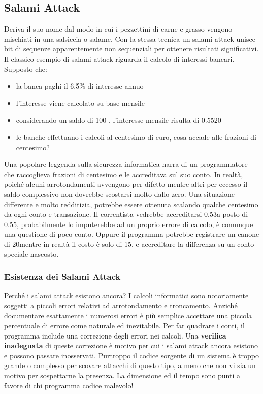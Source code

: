 \subsection{Salami Attack}
Deriva il suo nome dal modo in cui i pezzettini di carne e grasso vengono mischiati in una salsiccia o salame. Con la stessa tecnica un salami attack unisce bit di sequenze apparentemente non sequenziali per ottenere risultati significativi.
Il classico esempio di salami attack riguarda il calcolo di interessi bancari. Supposto che:
\begin{itemize}
	\item la banca paghi il 6.5\% di interesse annuo
	\item l'interesse viene calcolato su base mensile
	\item considerando un saldo di 100 \officialeuro, l'interesse mensile risulta di 0.5520 \officialeuro
	\item le banche effettuano i calcoli al centesimo di euro, cosa accade alle frazioni di centesimo?
\end{itemize}
Una popolare leggenda sulla sicurezza informatica narra di un programmatore che raccoglieva frazioni di centesimo e le accreditava sul suo conto.
In realtà, poiché alcuni arrotondamenti avvengono per difetto mentre altri per eccesso il saldo complessivo non dovrebbe scostarsi molto dallo zero.
\newline
Una situazione differente e molto redditizia, potrebbe essere ottenuta scalando qualche centesimo da ogni conto e transazione. Il correntista vedrebbe accreditarsi 0.53\officialeuro a posto di 0.55\officialeuro, probabilmente lo imputerebbe ad un proprio errore di calcolo, è comunque una questione di poco conto.
Oppure il programma potrebbe registrare un canone di 20\officialeuro mentre in realtà il costo è solo di 15\officialeuro, e accreditare la differenza su un conto speciale nascosto.
\subsubsection{Esistenza dei Salami Attack}
Perché i salami attack esistono ancora? I calcoli informatici sono notoriamente soggetti a piccoli errori relativi ad arrotondamento e troncamento. Anziché documentare esattamente i numerosi errori è più semplice accettare una piccola percentuale di errore come naturale ed inevitabile. 
Per far quadrare i conti, il programma include una correzione degli errori nei calcoli. Una \textbf{verifica inadeguata} di queste correzione è motivo per cui i salami attack ancora esistono e possono passare inosservati. 
Purtroppo il codice sorgente di un sistema è troppo grande o complesso per scovare attacchi di questo tipo, a meno che non vi sia un motivo per sospettarne la presenza. La dimensione ed il tempo sono punti a favore di chi programma codice malevolo!